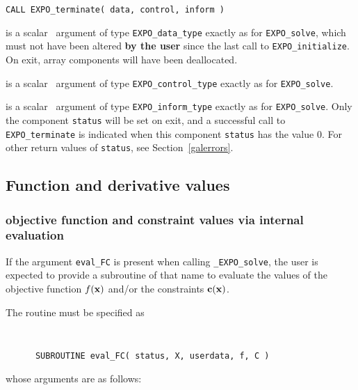\documentclass{galahad}
\newcommand{\packagename}{EXPO}
\newcommand{\fullpackagename}{\libraryname\_\packagename}
\newcommand{\solver}{{\tt \fullpackagename\_solve}}
\begin{document}
\hspace{8mm}
{\tt CALL \packagename\_terminate( data, control, inform )}

\vspace*{-1mm}
\begin{description}

 is a scalar \intentinout\ argument of type
{\tt \packagename\_data\_type}
exactly as for
{\tt \packagename\_solve},
which must not have been altered {\bf by the user} since the last call to
{\tt \packagename\_initialize}.
On exit, array components will have been deallocated.

 is a scalar \intentin\ argument of type
{\tt \packagename\_control\_type}
exactly as for
{\tt \packagename\_solve}.

 is a scalar \intentout\ argument of type
{\tt \packagename\_inform\_type}
exactly as for
{\tt \packagename\_solve}.
Only the component {\tt status} will be set on exit, and a
successful call to
{\tt \packagename\_terminate}
is indicated when this  component {\tt status} has the value 0.
For other return values of {\tt status}, see Section~\ref{galerrors}.

\end{description}


\subsection{Function and derivative values\label{fdv}}


\subsubsection{objective function and constraint values via internal evaluation\label{fcfv}}

If the argument {\tt eval\_FC} is present when calling \solver, the
user is expected to provide a subroutine of that name to evaluate the
values of the objective function $f({\mathbf{x}})$ and/or the constraints ${\mathbf{c}}({\mathbf{x}})$.

The routine must be specified as

\def\baselinestretch{0.8}
{\tt
\begin{verbatim}
      SUBROUTINE eval_FC( status, X, userdata, f, C )
\end{verbatim}
}
\def\baselinestretch{1.0}
\noindent whose arguments are as follows:
\end{document}
